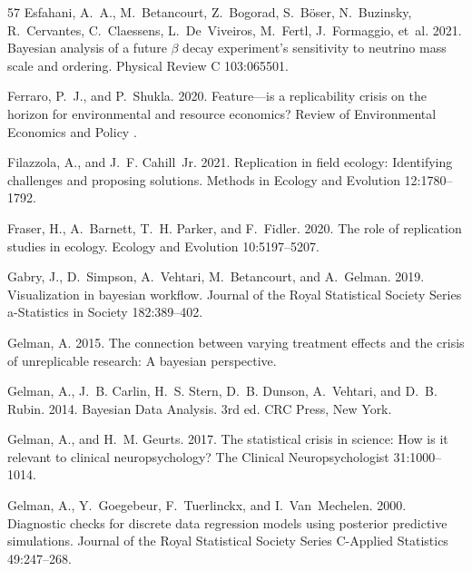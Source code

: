 \documentclass[11pt]{article}
\begin{document}
\begin{thebibliography}{57}
Esfahani, A.~A., M.~Betancourt, Z.~Bogorad, S.~B{\"o}ser, N.~Buzinsky,
  R.~Cervantes, C.~Claessens, L.~De~Viveiros, M.~Fertl, J.~Formaggio, et~al.
  2021.
\newblock Bayesian analysis of a future $\beta$ decay experiment's sensitivity
  to neutrino mass scale and ordering.
\newblock Physical Review C 103:065501.

Ferraro, P.~J., and P.~Shukla. 2020.
\newblock Feature---is a replicability crisis on the horizon for environmental
  and resource economics?
\newblock Review of Environmental Economics and Policy .

Filazzola, A., and J.~F. Cahill~Jr. 2021.
\newblock Replication in field ecology: Identifying challenges and proposing
  solutions.
\newblock Methods in Ecology and Evolution 12:1780--1792.

Fraser, H., A.~Barnett, T.~H. Parker, and F.~Fidler. 2020.
\newblock The role of replication studies in ecology.
\newblock Ecology and Evolution 10:5197--5207.

Gabry, J., D.~Simpson, A.~Vehtari, M.~Betancourt, and A.~Gelman. 2019.
\newblock Visualization in bayesian workflow.
\newblock Journal of the Royal Statistical Society Series a-Statistics in
  Society 182:389--402.

Gelman, A. 2015.
\newblock The connection between varying treatment effects and the crisis of
  unreplicable research: A bayesian perspective.

Gelman, A., J.~B. Carlin, H.~S. Stern, D.~B. Dunson, A.~Vehtari, and D.~B.
  Rubin. 2014.
\newblock Bayesian Data Analysis.
\newblock 3rd ed. CRC Press, New York.

Gelman, A., and H.~M. Geurts. 2017.
\newblock The statistical crisis in science: How is it relevant to clinical
  neuropsychology?
\newblock The Clinical Neuropsychologist 31:1000--1014.

Gelman, A., Y.~Goegebeur, F.~Tuerlinckx, and I.~Van~Mechelen. 2000.
\newblock Diagnostic checks for discrete data regression models using posterior
  predictive simulations.
\newblock Journal of the Royal Statistical Society Series C-Applied Statistics
  49:247--268.


\end{thebibliography}
\end{document}

